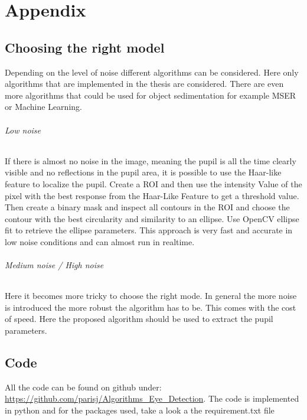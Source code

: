 \chapter{Appendix}
\label{appendix}
\section{Choosing the right model}
Depending on the level of noise different algorithms can be considered. Here only algorithms that are implemented in the thesis are considered. There are even more algorithms that could be used for object sedimentation for example MSER or Machine Learning. 
\subparagraph{Low noise}
If there is almost no noise in the image, meaning the pupil is all the time clearly visible and no reflections in the pupil area, it is possible to use the Haar-like feature to localize the pupil. Create a ROI and then use the intensity Value of the pixel with the best response from the Haar-Like Feature to get a threshold value. Then create a binary mask and inspect all contours in the ROI and choose the contour with the best circularity and similarity to an ellipse. Use OpenCV ellipse fit to retrieve the ellipse parameters. This approach is very fast and accurate in low noise conditions and can almost run in realtime. 
\subparagraph{Medium noise / High noise}
Here it becomes more tricky to choose the right mode. In general the more noise is introduced the more robust the algorithm has to be. This comes with the cost of speed. Here the proposed algorithm should be used to extract the pupil parameters. 

\section{Code}
All the code can be found on github under: \url{https://github.com/parisj/Algorithms_Eye_Detection}. The code is implemented in python and for the packages used, take a look a the requirement.txt file